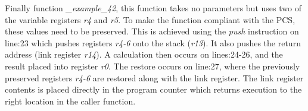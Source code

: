 Finally function \textit{\_example\_42}, this function takes no parameters but uses two of the variable registers \textit{r4} and \textit{r5}. To make the function compliant with the PCS, these values need to be preserved. This is achieved using the \textit{push} instruction on line:23 which pushes registers \textit{r4-6} onto the stack (\textit{r13}). It also pushes the return address (link register \textit{r14}). A calculation then occurs on lines:24-26, and the result placed into register \textit{r0}. The restore occurs on line:27, where the previously preserved registers \textit{r4-6} are restored along with the link register. The link register contents is placed directly in the program counter which returns execution to the right location in the caller function.  


